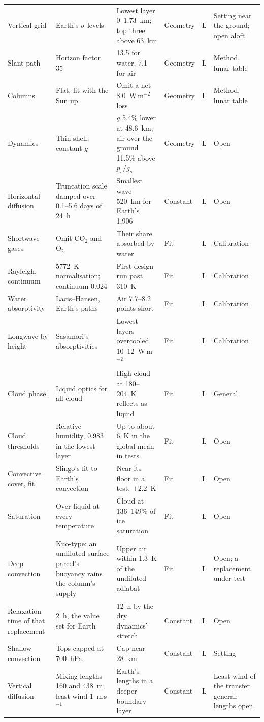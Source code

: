 {\begin{xltabular}{\textwidth}{@{}>{\raggedright\arraybackslash}p{0.13\textwidth}LL>{\raggedright\arraybackslash}p{0.083\textwidth}>{\centering\arraybackslash}p{0.04\textwidth}>{\raggedright\arraybackslash}p{0.12\textwidth}@{}}
Vertical grid & Earth's $\sigma$ levels & Lowest layer 0--1.73~km; top three above 63~km & Geometry & L & Setting near the ground; open aloft \\
Slant path & Horizon factor 35 & 13.5 for water, 7.1 for air & Geometry & L & Method, lunar table \\
Columns & Flat, lit with the Sun up & Omit a net 8.0~W\,m$^{-2}$ loss & Geometry & L & Method, lunar table \\
Dynamics & Thin shell, constant $g$ & $g$ 5.4\% lower at 48.6~km; air over the ground 11.5\% above $p_s/g_s$ & Geometry & L & Open \\
Horizontal diffusion & Truncation scale damped over 0.1--5.6 days of 24~h & Smallest wave 520~km for Earth's 1,906 & Constant & L & Open \\
Shortwave gases & Omit CO$_2$ and O$_2$ & Their share absorbed by water & Fit & L & Calibration \\
Rayleigh, continuum & 5772~K normalisation; continuum 0.024 & First design run past 310~K & Fit & L & Calibration \\
Water absorptivity & Lacis--Hansen, Earth's paths & Air 7.7--8.2 points short & Fit & L & Calibration \\
Longwave by height & Sasamori's absorptivities & Lowest layers overcooled 10--12~W\,m$^{-2}$ & Fit & L & Calibration \\
Cloud phase & Liquid optics for all cloud & High cloud at 180--204~K reflects as liquid & Fit & L & General \\
Cloud thresholds & Relative humidity, 0.983 in the lowest layer & Up to about 6~K in the global mean in tests & Fit & L & Open \\
Convective cover, fit & Slingo's fit to Earth's convection & Near its floor in a test, $+2.2$~K & Fit & L & Open \\
Saturation & Over liquid at every temperature & Cloud at 136--149\% of ice saturation & Fit & L & Open \\
Deep convection & Kuo-type: an undiluted surface parcel's buoyancy rains the column's supply & Upper air within 1.3~K of the undiluted adiabat & Fit & L & Open; a replacement under test \\
Relaxation time of that replacement & 2~h, the value set for Earth & 12~h by the dry dynamics' stretch & Constant & L & Open \\
Shallow convection & Tops capped at 700~hPa & Cap near 28~km & Constant & L & Setting \\
Vertical diffusion & Mixing lengths 160 and 438~m; least wind 1~m\,s$^{-1}$ & Earth's lengths in a deeper boundary layer & Constant & L & Least wind of the transfer general; lengths open \\

\end{xltabular}}
